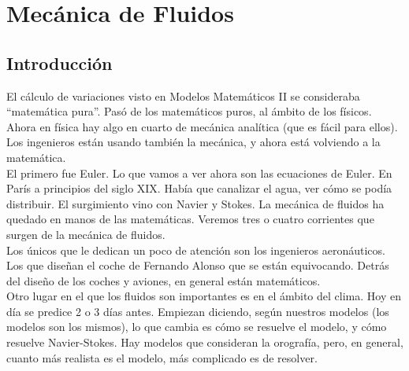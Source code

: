 \chapter{Mecánica de Fluidos}
\noindent

\section{Introducción}

El cálculo de variaciones visto en Modelos Matemáticos II se consideraba ``matemática pura''. Pasó de los matemáticos puros, al ámbito 
de los físicos. Ahora en física hay algo en cuarto de mecánica analítica (que es fácil para ellos). Los ingenieros están usando también
la mecánica, y ahora está volviendo a la matemática. \\

El primero fue Euler. Lo que vamos a ver ahora son las ecuaciones de Euler. En París a principios del siglo XIX. Había que canalizar el agua,
ver cómo se podía distribuir. El surgimiento vino con Navier y Stokes. La mecánica de fluidos ha quedado en manos de las matemáticas. Veremos 
tres o cuatro corrientes que surgen de la mecánica de fluidos. \\

Los únicos que le dedican un poco de atención son los ingenieros aeronáuticos. Los que diseñan el coche de Fernando Alonso que se están equivocando. 
Detrás del diseño de los coches y aviones, en general están matemáticos. \\

Otro lugar en el que los fluidos son importantes es en el ámbito del clima. Hoy en día se predice 2 o 3 días antes. Empiezan diciendo, según
nuestros modelos (los modelos son los mismos), lo que cambia es cómo se resuelve el modelo, y cómo resuelve Navier-Stokes. Hay modelos que 
consideran la orografía, pero, en general, cuanto más realista es el modelo, más complicado es de resolver. \\

